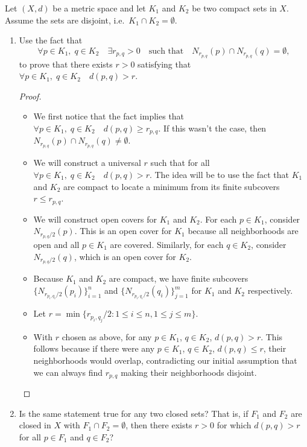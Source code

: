 \documentclass[10pt]{article}
\newenvironment{problem}[2][Problem]{\begin{trivlist}
\item[\hskip \labelsep {\bfseries #1}\hskip \labelsep {\bfseries #2.}]}{\end{trivlist}}
\begin{document}
\begin{problem}{4}
	Let $ (X,d) $ be a metric space and let $ K_1 $ and $K_2 $ be two compact sets in $ X $. Assume the sets are disjoint, i.e.~$ K_1 \cap K_2 = \emptyset $. 
	\begin{enumerate}
		\item Use the fact that 
		\[ \forall p \in K_1,\; q \in K_2 \quad \exists r_{p,q}>0 \quad \text{such that} \quad N_{r_{p,q}}(p) \cap N_{r_{p,q}}(q) = \emptyset,  \]
		to prove that there exists $ r>0 $ satisfying that $ \forall p \in K_1,\; q \in K_2 \quad d(p,q)>r $.
        \begin{proof}
            \hfill
            \begin{itemize}
                \item We first notice that the fact implies that $\forall p \in K_1,\; q \in K_2 \quad d(p, q) \geq r_{p,q}$.
                    If this wasn't the case, then $N_{r_{p,q}}(p) \cap N_{r_{p,q}}(q) \neq \emptyset$.
                \item We will construct a universal $r$ such that for all $\forall p \in K_1,\; q \in K_2 \quad d(p, q) > r$. The idea will be to use the fact that $K_1$ and $K_2$ are compact to locate a minimum from its finite subcovers $r \leq r_{p, q}$.
                \item We will construct open covers for $K_1$ and $K_2$. For each $p \in K_1$, consider $N_{r_{p,q}/2}(p)$. This is an open cover for $K_1$ because all neighborhoods are open and all $p \in K_1$ are covered.
                    Similarly, for each $q \in K_2$, consider $N_{r_{p,q}/2}(q)$, which is an open cover for $K_2$.
                \item Because $K_1$ and $K_2$ are compact, we have finite subcovers $\{N_{r_{p_i,q_i}/2}(p_i)\}_{i=1}^n$ and $\{N_{r_{p_i,q_i}/2}(q_i)\}_{j=1}^m$ for $K_1$ and $K_2$ respectively.
                \item Let $r = \min\{r_{p_i,q_j}/2 : 1 \leq i \leq n, 1 \leq j \leq m\}$.
                \item With $r$ chosen as above, for any $p \in K_1$, $q \in K_2$, $d(p,q) > r$. This follows because if there were any $p \in K_1$, $q \in K_2$, $d(p,q) \leq r$, their neighborhoods would overlap, contradicting our initial assumption that we can always find $r_{p,q}$ making their neighborhoods disjoint.
            \end{itemize}
        \end{proof}
		\item Is the same statement true for any two closed sets? That is, if $ F_1 $ and $F_2 $ are closed in $ X $ with $ F_1 \cap F_2 = \emptyset $, then there exists $ r>0 $ for which $ d(p,q) > r $ for all $ p \in F_1 $ and $ q \in F_2 $?

\end{enumerate}
\end{problem}
\end{document}

